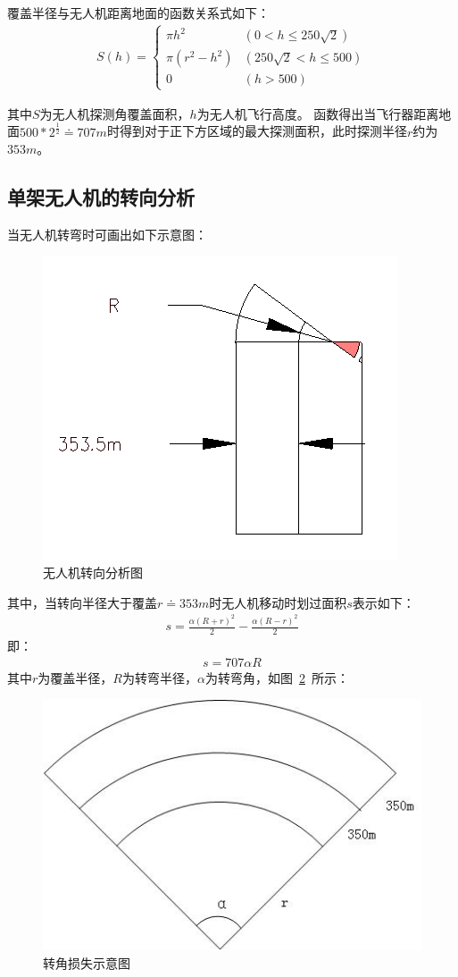 \documentclass{whutmod}
\begin{document}
	覆盖半径与无人机距离地面的函数关系式如下：
	\begin{gather}
		S(h) = \left\{\begin{matrix}
		\pi h^{2} & (0<h\leqslant 250\sqrt{2})\\ 
		\pi (r^{2}-h^{2})& (250\sqrt{2}<h\leqslant 500)\\ 
		0& (h>500)
		\end{matrix}\right.
	\end{gather}
	
	其中$S$为无人机探测角覆盖面积，$h$为无人机飞行高度。
	函数得出当飞行器距离地面$500*2^{\frac{1}{2}}\doteq 707m$时得到对于正下方区域的最大探测面积，此时探测半径$r$约为$353m$。
	
	\subsection{单架无人机的转向分析}
	当无人机转弯时可画出如下示意图：
	\begin{figure}[H]
		\centering
		\includegraphics[width=.7\textwidth]{figures/zhuanwan.png}
		\caption{无人机转向分析图}\label{zhuanwan}
	\end{figure}
	
	其中，当转向半径大于覆盖$r\doteq 353m$时无人机移动时划过面积$s$表示如下：
	\begin{gather}
	s=\frac{\alpha (R+r)^{2}}{2}-\frac{\alpha (R-r)^{2}}{2}
	\end{gather}
	即：
	\begin{gather*}
	s=707\alpha R
	\end{gather*}
	其中$r$为覆盖半径，$R$为转弯半径，$\alpha $为转弯角，如图~\ref{ssss}~所示：
		\begin{figure}[H]
		\centering
		\includegraphics[width=.4\textwidth]{figures/sss.jpg}
		\caption{转角损失示意图}\label{ssss}
	\end{figure}
	
\end{document}

